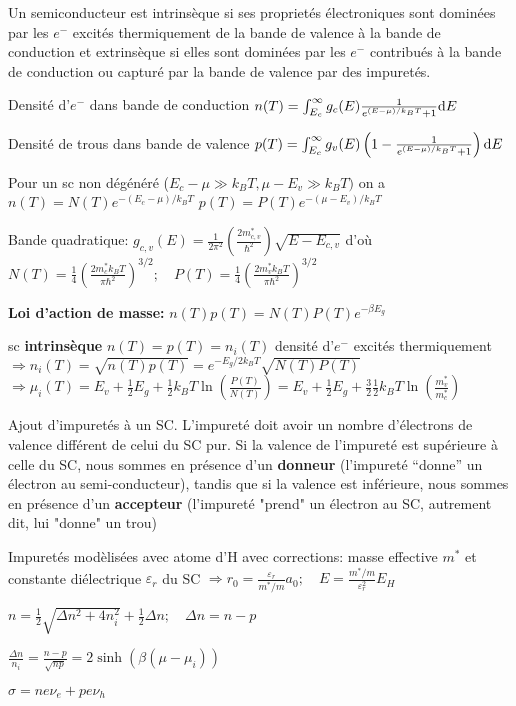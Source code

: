 Un semiconducteur est intrinsèque si ses proprietés électroniques sont dominées par les $e^-$ excités thermiquement de la bande de valence à la bande de conduction et extrinsèque si elles sont dominées par les $e^-$ contribués à la bande de conduction ou capturé par la bande de valence par des impuretés.
\begin{squishlist}
    \item Densité d'$e^-$ dans bande de conduction $n(T) = \int_{E_c}^{\infty} g_c(E) \frac{1}{e^{(E-\mu)/k_B T} + 1} \textrm{d} E$
    \item Densité de trous dans bande de valence $p(T) =\int_{E_c}^{\infty} g_v(E)\left( 1- \frac{1}{e^{(E-\mu)/k_B T} + 1} \right)\textrm{d} E$
    \item Pour un sc non dégénéré ($E_c - \mu \gg k_B T, \mu -E_v \gg k_B T)$ on a \\ $n(T) = N(T) e^{-(E_c - \mu) / k_B T}$ \quad $p(T) = P(T) e^{-(\mu - E_v) / k_B T}$
    \item Bande quadratique: $g_{c,v}(E) = \frac{1}{2 \pi^2}\left( \frac{2m^*_{c,v}}{\hbar^2}\right) \sqrt{E - E_{c,v}}$
    d'où \\
    $N(T) = \frac{1}{4} \left( \frac{2 m_c^* k_B T}{\pi \hbar^2}\right)^{3/2};\quad P(T) = \frac{1}{4} \left( \frac{2 m_v^* k_B T}{\pi \hbar^2}\right)^{3/2}$
    \item \textbf{Loi d'action de masse:} $n(T)p(T) = N(T)P(T) e^{-\beta E_g}$
    \item sc \textbf{intrinsèque} $n(T) = p(T) = n_i(T)$ \quad densité d'$e^-$ excités thermiquement \\
    $\Longrightarrow n_i(T) = \sqrt{n(T) p(T)} = e^{-E_g / 2 k_B T} \sqrt{N(T) P(T)}$ \\
    $\Longrightarrow \mu_i(T) = E_v + \frac{1}{2}E_g + \frac{1}{2}k_B T \ln \left( \frac{P(T)}{N(T)}\right) = E_v + \frac{1}{2}E_g + \frac{3}{2}\frac{1}{2}k_B T \ln \left( \frac{m_v^*}{m_c^*}\right)$
\end{squishlist}

Ajout d’impuretés à un SC.
L’impureté doit avoir un nombre d’électrons de valence diﬀérent de celui du SC pur. Si la valence de l’impureté est supérieure à celle du SC, nous sommes en présence d’un \textbf{donneur} (l’impureté “donne” un électron au semi-conducteur), tandis que si la valence est inférieure, nous sommes en présence d’un \textbf{accepteur} (l’impureté "prend" un électron au SC, autrement dit, lui "donne" un trou)
\begin{squishlist}
    \item Impuretés modèlisées avec atome d'H avec corrections: masse effective $m^*$ et constante diélectrique $\varepsilon_r$ du SC 
    $\Longrightarrow r_0 = \frac{\varepsilon_r}{m^*/m} a_0; \quad E=\frac{m^*/m}{\varepsilon_r^2}E_H$
    \item $n = \frac{1}{2}\sqrt{\Delta n^2 + 4 n_i^2} + \frac{1}{2}\Delta n;\quad \Delta n = n - p$
    \item $\frac{\Delta n }{n_i} = \frac{n-p}{\sqrt{np}} = 2 \sinh (\beta(\mu - \mu_i))$
    \item $\sigma = n e \nu_e + p e \nu_h$
\end{squishlist}    


